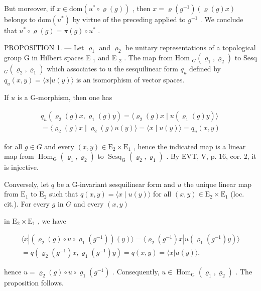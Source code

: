 But moreover, if \(x \in \text{dom}(u^{*} \circ \varrho(g))\) , then \(x = \varrho(g^{-1})(\varrho(g)x)\) belongs to \(\text{dom}(u^{*})\) by virtue of the preceding applied to \(g^{-1}\) . We conclude that \(u^{*} \circ \varrho(g) = \pi(g) \circ u^{*}\) .

PROPOSITION 1. --- Let \(\varrho_{1}\) and \(\varrho_{2}\) be unitary representations of a topological group G in Hilbert spaces E \(_{1}\) and E \(_{2}\) . The map from Hom \(_{G}(\varrho_{1},\varrho_{2})\) to Sesq \(_{G}(\varrho_{2},\varrho_{1})\) which associates to u the sesquilinear form \(q_{u}\) defined by \(q_{u}(x,y)=\langle x|u(y)\rangle\) is an isomorphism of vector spaces.

If \(u\) is a G-morphism, then one has

\[
\begin{array}{c} q _ {u} (\varrho_ {2} (g) x, \varrho_ {1} (g) y) = \langle \varrho_ {2} (g) x \mid u (\varrho_ {1} (g)y) \rangle \\ = \langle \varrho_ {2} (g) x \mid \varrho_ {2} (g) u (y) \rangle = \langle x \mid u (y) \rangle = q _ {u} (x, y) \end{array}
\]

for all \(g \in G\) and every \((x, y) \in \mathrm{E}_{2} \times \mathrm{E}_{1}\) , hence the indicated map is a linear map from \(\operatorname{Hom}_{\mathrm{G}}(\varrho_{1}, \varrho_{2})\) to \(\operatorname{Sesq}_{\mathrm{G}}(\varrho_{2}, \varrho_{1})\) . By EVT, V, p. 16, cor. 2, it is injective.

Conversely, let \(q\) be a G-invariant sesquilinear form and \(u\) the unique linear map from \(\mathrm{E}_1\) to \(\mathrm{E}_2\) such that \(q(x,y) = \langle x \mid u(y) \rangle\) for all \((x,y) \in \mathrm{E}_2 \times \mathrm{E}_1\) (loc. cit.). For every \(g\) in \(G\) and every \((x,y)\)

in \(\mathrm{E}_2\times \mathrm{E}_1\) , we have

\[
\begin{array}{c} \langle x | (\varrho_ {2} (g) \circ u \circ \varrho_ {1} (g ^ {- 1})) (y) \rangle = \langle \varrho_ {2} (g ^ {- 1}) x | u (\varrho_ {1} (g ^ {- 1}) y) \rangle \\ = q (\varrho_ {2} (g ^ {- 1}) x, \varrho_ {1} (g ^ {- 1}) y) = q (x, y) = \langle x | u (y) \rangle , \end{array}
\]

hence \(u = \varrho_{2}(g) \circ u \circ \varrho_{1}(g^{-1})\) . Consequently, \(u \in \operatorname{Hom}_{\mathrm{G}}(\varrho_{1}, \varrho_{2})\) . The proposition follows.

